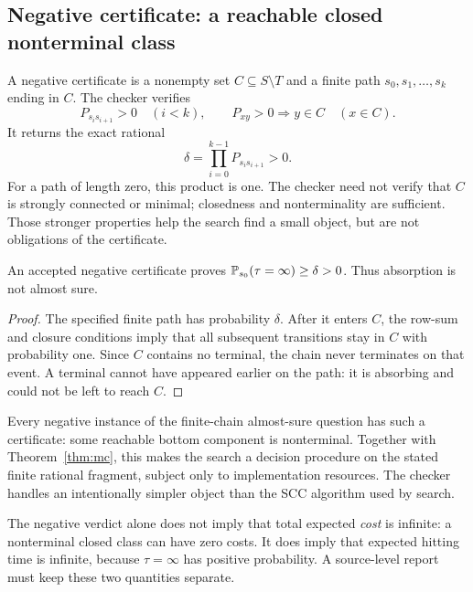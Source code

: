 \subsection{Negative certificate: a reachable closed nonterminal class}
A negative certificate is a nonempty set $C\subseteq S\setminus T$ and a
finite path $s_0,s_1,\ldots,s_k$ ending in $C$. The checker verifies
\begin{equation}
 P_{s_i s_{i+1}}>0\quad(i<k),\qquad
 P_{xy}>0\Longrightarrow y\in C\quad(x\in C).
 \label{eq:trap}
\end{equation}
It returns the exact rational
\[
 \delta=\prod_{i=0}^{k-1}P_{s_i s_{i+1}}>0.
\]
For a path of length zero, this product is one. The checker need not verify
that $C$ is strongly connected or minimal; closedness and nonterminality are
sufficient. Those stronger properties help the search find a small object,
but are not obligations of the certificate.

\begin{theorem}
\label{thm:trap}
An accepted negative certificate proves
$\mathbb{P}_{s_0}(\tau=\infty)\geq\delta>0$. Thus absorption is not almost sure.
\end{theorem}
\begin{proof}
The specified finite path has probability $\delta$. After it enters $C$, the
row-sum and closure conditions imply that all subsequent transitions stay in
$C$ with probability one. Since $C$ contains no terminal, the chain never
terminates on that event. A terminal cannot have appeared earlier on the path:
it is absorbing and could not be left to reach $C$.
\end{proof}

Every negative instance of the finite-chain almost-sure question has such a
certificate: some reachable bottom component is nonterminal. Together with
Theorem~\ref{thm:mc}, this makes the search a decision procedure on the stated
finite rational fragment, subject only to implementation resources. The
checker handles an intentionally simpler object than the SCC algorithm used
by search.

The negative verdict alone does not imply that total expected \emph{cost} is
infinite: a nonterminal closed class can have zero costs. It does imply that
expected hitting time is infinite, because $\tau=\infty$ has positive
probability. A source-level report must keep these two quantities separate.


